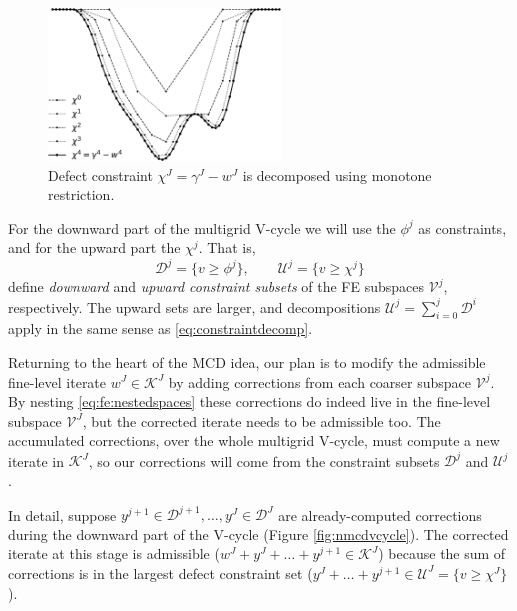 \documentclass[letterpaper,final,12pt,reqno]{amsart}
\theoremstyle{cstyle}
\theoremstyle{cstyle*}
\theoremstyle{dstyle}
\numberwithin{equation}{section}
\numberwithin{figure}{section}
\numberwithin{table}{section}
\numberwithin{theorem}{section}
\begin{document}
\begin{figure}
\includegraphics[width=0.55\textwidth]{fixfigs/chiphilevels.pdf}
\caption{Defect constraint $\chi^J = \gamma^J - w^J$ is decomposed using monotone restriction.}
\label{fig:chiphilevels}
\end{figure}

For the downward part of the multigrid V-cycle we will use the $\phi^j$ as constraints, and for the upward part the $\chi^j$.  That is,
\begin{equation}
\mathcal{D}^j = \{v\ge \phi^j\}, \qquad \mathcal{U}^j = \{v\ge \chi^j\} \label{eq:fe:constraintsets}
\end{equation}
define \emph{downward} and \emph{upward constraint subsets} of the FE subspaces $\mathcal{V}^j$, respectively.  The upward sets are larger, and decompositions $\mathcal{U}^j = \sum_{i=0}^j \mathcal{D}^i$ apply in the same sense as \eqref{eq:constraintdecomp}.

Returning to the heart of the MCD idea, our plan is to modify the admissible fine-level iterate $w^J\in \mathcal{K}^J$ by adding corrections from each coarser subspace $\mathcal{V}^j$.  By nesting \eqref{eq:fe:nestedspaces} these corrections do indeed live in the fine-level subspace $\mathcal{V}^J$, but the corrected iterate needs to be admissible too.  The accumulated corrections, over the whole multigrid V-cycle, must compute a new iterate in $\mathcal{K}^J$, so our corrections will come from the constraint subsets $\mathcal{D}^j$ and $\mathcal{U}^j$.

In detail, suppose $y^{j+1} \in \mathcal{D}^{j+1}, \dots, y^J \in \mathcal{D}^J$ are already-computed corrections during the downward part of the V-cycle (Figure \ref{fig:nmcdvcycle}).  The corrected iterate at this stage is admissible ($w^J + y^J + \dots + y^{j+1} \in \mathcal{K}^J$) because the sum of corrections is in the largest defect constraint set ($y^J + \dots + y^{j+1} \in \mathcal{U}^J = \{v\ge \chi^J\}$).
\end{document}
